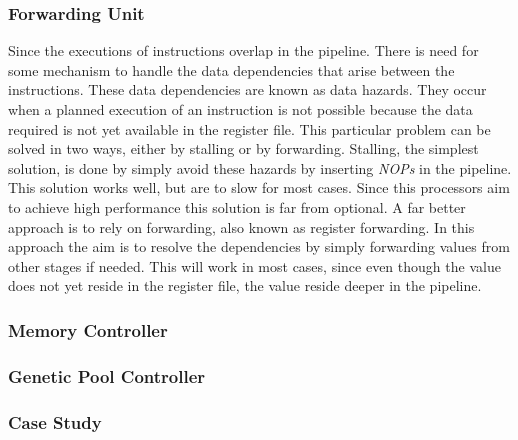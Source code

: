 \subsubsection{Forwarding Unit} \label{fpga:fitness:sss:forwarding_unit}
Since the executions of instructions overlap in the pipeline. There is need for some mechanism to handle the data dependencies that arise between the instructions. These data dependencies are known as data hazards. They occur when a planned execution of an instruction is not possible because the data required is not yet available in the register file. This particular problem can be solved in two ways, either by stalling or by forwarding. Stalling, the simplest solution, is done by simply avoid these hazards by inserting \emph{NOPs} in the pipeline. This solution works well, but are to slow for most cases. Since this processors aim to achieve high performance this solution is far from optional. A far better approach is to rely on forwarding, also known as register forwarding. In this approach the aim is to resolve the dependencies by simply forwarding values from other stages if needed. This will work in most cases, since even though the value does not yet reside in the register file, the value reside deeper in the pipeline.  





\subsubsection{Memory Controller} \label{fpga:fitness:sss:memory_controller}

\subsubsection{Genetic Pool Controller} \label{fpga:fitness:sss:genetic_pool_controller}

\subsubsection{Case Study} \label{fpga:fitness:sss:case_study}




